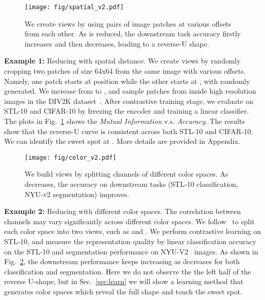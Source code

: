 \documentclass{article}
\begin{document}
\begin{figure}[ht]
\centering
\texttt{[image: fig/spatial\_v2.pdf]}
\vspace{-7pt}
\caption{\small We create views by using pairs of image patches at various offsets from each other. As  is reduced, the downstream task accuracy firstly increases and then decreases, leading to a reverse-U shape.}
\label{fig:spatial}
\end{figure}
 \label{sec:spatial}

\textbf{Example 1:} Reducing  with spatial distance. We create views by randomly cropping two patches of size 64x64 from the same image with various offsets. Namely, one patch starts at position  while the other starts at , with  randomly generated. We increase  from  to , and sample patches from inside high resolution images in the DIV2K dataset~\cite{agustsson2017ntire}. After contrastive training stage, we evaluate on STL-10 and CIFAR-10 by freezing the encoder and training a linear classifier. The plots in Fig.~\ref{fig:spatial} shows the \emph{Mutual Information} v.s. \emph{Accuracy}. The results show that the reverse-U curve is consistent across both STL-10 and CIFAR-10. We can identify the sweet spot at . More details are provided in Appendix.

\begin{figure}[ht]
\centering
\texttt{[image: fig/color\_v2.pdf]}
\vspace{-7pt}
\caption{\small We build views by splitting channels of different color spaces. As  decreases, the accuracy on downstream tasks (STL-10 classification, NYU-v2 segmentation) improves.}
\label{fig:color}
\end{figure}
 \textbf{Example 2:} Reducing  with different color spaces. The correlation between channels may vary significantly across different color spaces. We follow~\cite{tian2019contrastive,zhang2017split} to split each color space into two views, such as  and . We perform contrastive learning on STL-10, and measure the representation quality by linear classification accuracy on the STL-10 and segmentation performance on NYU-V2~\cite{Silberman:ECCV12} images. As shown in Fig.~\ref{fig:color}, the downstream performance keeps increasing as  decreases for both classification and segmentation.  Here we do not observe the the left half of the reverse U-shape, but in Sec.~\ref{sec:learn} we will show a learning method that generates color spaces which reveal the full shape and touch the sweet spot.
\end{document}
